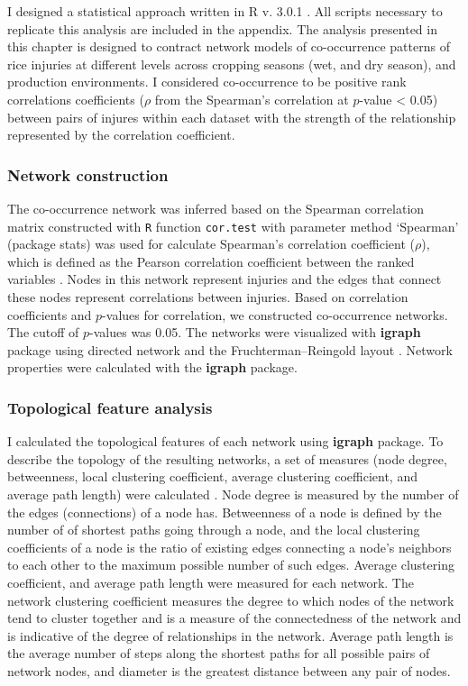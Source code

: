 I designed a statistical approach written in R v. 3.0.1 \citep{R_2015}. All scripts necessary to replicate this analysis are included in the appendix. The analysis presented in this chapter is designed to contract network models of co-occurrence patterns of rice injuries at different levels across cropping seasons (wet, and dry season), and production environments. I considered co-occurrence to be positive rank correlations coefficients ($\rho$ from the Spearman’s correlation at $p$-value < 0.05) between pairs of injures within each dataset with the strength of the relationship represented by the correlation coefficient. 

\subsubsection{Network construction}

The co-occurrence network was inferred based on the Spearman correlation matrix constructed with \texttt{R} function \texttt{cor.test} with parameter method `Spearman' (package stats) was used for calculate Spearman's correlation coefficient ($\rho$), which is defined as the Pearson correlation coefficient between the ranked variables \citep{R_2015}. Nodes in this network represent injuries and the edges that connect these nodes represent correlations between injuries. Based on correlation coefficients and $p$-values for correlation, we constructed co-occurrence networks. The cutoff of $p$-values was 0.05.  The networks were visualized with \textbf{igraph} package \citep{Csardi_2010_igraph} using directed network and the Fruchterman–Reingold layout \citep{Fruchterman_1991_Graph}. Network properties were calculated with the \textbf{igraph} package.

\subsubsection{Topological feature analysis}

I calculated the topological features of each network using \textbf{igraph} package. To describe the topology of the resulting networks, a set of measures (node degree, betweenness, local clustering coefficient, average clustering coefficient, and average path length) were calculated \citep{Newman_2006_Modularity}. Node degree is measured by the number of the edges (connections) of a node has. Betweenness of a node is defined by the number of of shortest paths going through a node, and the local clustering coefficients of a node is the ratio of existing edges connecting a node's neighbors to each other to the maximum possible number of such edges. Average clustering coefficient, and average path length were measured for each network. The network clustering coefficient measures the degree to which nodes of the network tend to cluster together and is a measure of the connectedness of the network and is indicative of the degree of relationships in the network. Average path length is the average number of steps along the shortest paths for all possible pairs of network nodes, and diameter is the greatest distance between any pair of nodes. 


